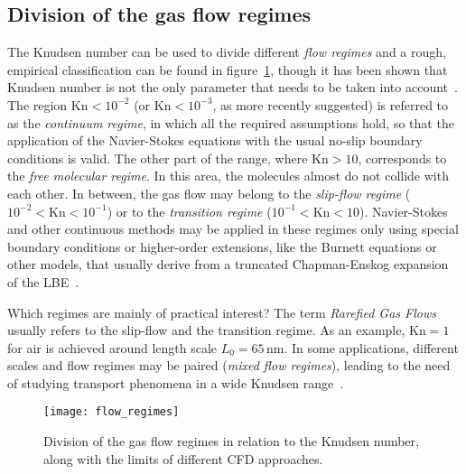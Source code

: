 \subsection{Division of the gas flow regimes}
The Knudsen number can be used to divide different \textit{flow regimes} and a
rough, empirical classification can be found in figure~\ref{fig:flow_regimes},
though it has been shown that Knudsen number is not the only parameter that needs
to be taken into account~\cite{Barber2006}.
The region $\mathrm{Kn}<10^{-2}$ (or $\mathrm{Kn}<10^{-3}$, as more recently suggested)
is referred to as the \textit{continuum regime}, in which all the required
assumptions hold, so that the application of the Navier-Stokes equations with the usual
no-slip boundary conditions is valid.
The other part of the range, where $\mathrm{Kn}>10$, corresponds to the
\textit{free molecular regime}. In this area, the molecules almost do not collide
with each other.
In between, the gas flow may belong to the \textit{slip-flow regime}
($10^{-2} < \mathrm{Kn} < 10^{-1} $) or to the \textit{transition regime}
($10^{-1} < \mathrm{Kn} < 10 $). Navier-Stokes and other continuous methods
may be applied in these regimes only using special boundary conditions or
higher-order extensions, like the Burnett equations or other models,
that usually derive from a truncated Chapman-Enskog expansion of the LBE~\cite{Zhang2012}.

Which regimes are mainly of practical interest? The term \textit{Rarefied Gas Flows} 
usually refers to the slip-flow and the
transition regime. As an example, $\mathrm{Kn}=1$ for air 
is achieved around length scale $L_0 = 65\,\mathrm{nm}$.
In some applications, different scales and flow regimes may be paired (\textit{mixed flow regimes}),
leading to the need of studying transport phenomena in a wide Knudsen range~\cite{Karniadakis_Microflows}.

\begin{figure}[h!]%
 	\begin{center}%
 		\texttt{[image: flow\_regimes]}%
 		\caption{Division of the gas flow regimes in relation to the Knudsen %
 		number, along with the limits of different CFD %
 		approaches.~\cite{Zhang2012}}%
 		\label{fig:flow_regimes}%
 	\end{center}%
\end{figure}

